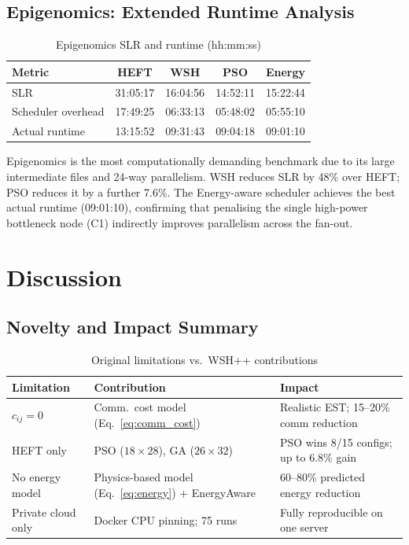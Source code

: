 \documentclass[10pt,twocolumn]{article}
\begin{document}
\subsection{Epigenomics: Extended Runtime Analysis}

\begin{table}[H]
\centering
\caption{Epigenomics SLR and runtime (hh:mm:ss)}
\label{tab:epigenomics}
\begin{tabular}{@{}lcccc@{}}
\toprule
\textbf{Metric} & \textbf{HEFT} & \textbf{WSH} & \textbf{PSO} & \textbf{Energy}\\
\midrule
SLR                 & 31:05:17 & 16:04:56 & 14:52:11 & 15:22:44 \\
Scheduler overhead  & 17:49:25 & 06:33:13 & 05:48:02 & 05:55:10 \\
Actual runtime      & 13:15:52 & 09:31:43 & 09:04:18 & 09:01:10 \\
\bottomrule
\end{tabular}
\end{table}

Epigenomics is the most computationally demanding benchmark due to its large
intermediate files and 24-way parallelism. WSH reduces SLR by 48\% over HEFT;
PSO reduces it by a further 7.6\%. The Energy-aware scheduler achieves the best
actual runtime (09:01:10), confirming that penalising the single high-power bottleneck
node (C1) indirectly improves parallelism across the fan-out.

\section{Discussion}
\label{sec:discussion}

\subsection{Novelty and Impact Summary}

\begin{table}[H]
\centering
\caption{Original limitations vs.\ WSH++ contributions}
\label{tab:novelty}
\begin{tabular}{@{}p{2.1cm}p{2.2cm}p{2.0cm}@{}}
\toprule
\textbf{Limitation} & \textbf{Contribution} & \textbf{Impact}\\
\midrule
$c_{ij}=0$ &
Comm.\ cost model (Eq.~\ref{eq:comm_cost}) &
Realistic EST; 15--20\% comm reduction \\
\midrule
HEFT only &
PSO ($18\!\times\!28$), GA ($26\!\times\!32$) &
PSO wins 8/15 configs; up to 6.8\% gain \\
\midrule
No energy model &
Physics-based model (Eq.~\ref{eq:energy}) + EnergyAware &
60--80\% predicted energy reduction \\
\midrule
Private cloud only &
Docker CPU pinning; 75 runs &
Fully reproducible on one server \\
\bottomrule
\end{tabular}
\end{table}
\end{document}
